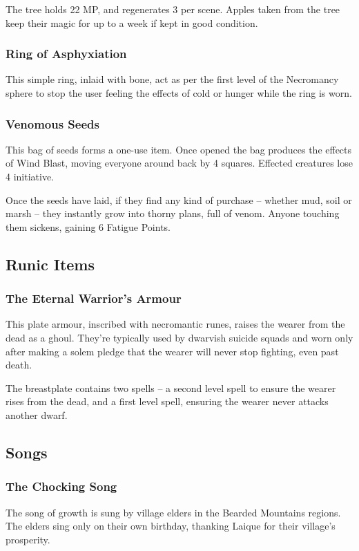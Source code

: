 The tree holds 22 MP, and regenerates 3 per scene.  Apples taken from the tree keep their magic for up to a week if kept in good condition.

\subsubsection{Ring of Asphyxiation}

This simple ring, inlaid with bone, act as per the first level of the Necromancy sphere to stop the user feeling the effects of cold or hunger while the ring is worn.

\subsubsection{Venomous Seeds}

This bag of seeds forms a one-use item.  Once opened the bag produces the effects of Wind Blast, moving everyone around back by 4 squares.  Effected creatures lose 4 initiative.

Once the seeds have laid, if they find any kind of purchase -- whether mud, soil or marsh -- they instantly grow into thorny plans, full of venom.  Anyone touching them sickens, gaining 6 Fatigue Points.

\subsection{Runic Items}

\subsubsection{The Eternal Warrior's Armour}

This plate armour, inscribed with necromantic runes, raises the wearer from the dead as a ghoul.  They're typically used by dwarvish suicide squads and worn only after making a solem pledge that the wearer will never stop fighting, even past death.

The breastplate contains two spells -- a second level spell to ensure the wearer rises from the dead, and a first level spell, ensuring the wearer never attacks another dwarf.

\subsection{Songs}

\subsubsection{The Chocking Song}
The song of growth is sung by village elders in the Bearded Mountains regions.  The elders sing only on their own birthday, thanking Laique for their village's prosperity.

